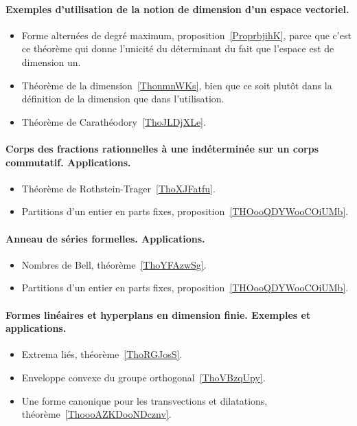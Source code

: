 \paragraph{Exemples d'utilisation de la notion de dimension d'un espace vectoriel.}
\begin{itemize}
	\item Forme alternées de degré maximum, proposition~\ref{ProprbjihK}, parce que c'est ce théorème qui donne l'unicité du déterminant du fait que l'espace est de dimension un.
	\item Théorème de la dimension~\ref{ThonmnWKs}, bien que ce soit plutôt dans la définition de la dimension que dans l'utilisation.
	\item Théorème de Carathéodory~\ref{ThoJLDjXLe}.
\end{itemize}

\paragraph{Corps des fractions rationnelles à une indéterminée sur un corps commutatif. Applications.}
\begin{itemize}
	\item Théorème de Rothstein-Trager~\ref{ThoXJFatfu}.
	\item Partitions d'un entier en parts fixes, proposition~\ref{THOooQDYWooCOiUMb}.
\end{itemize}

\paragraph{Anneau de séries formelles. Applications.}
\begin{itemize}
	\item Nombres de Bell, théorème~\ref{ThoYFAzwSg}.
	\item Partitions d'un entier en parts fixes, proposition~\ref{THOooQDYWooCOiUMb}.
\end{itemize}
\paragraph{Formes linéaires et hyperplans en dimension finie. Exemples et applications.}
\begin{itemize}
	\item Extrema liés, théorème~\ref{ThoRGJosS}.
	\item Enveloppe convexe du groupe orthogonal~\ref{ThoVBzqUpy}.
	\item Une forme canonique pour les transvections et dilatations, théorème~\ref{ThoooAZKDooNDcznv}.
\end{itemize}
